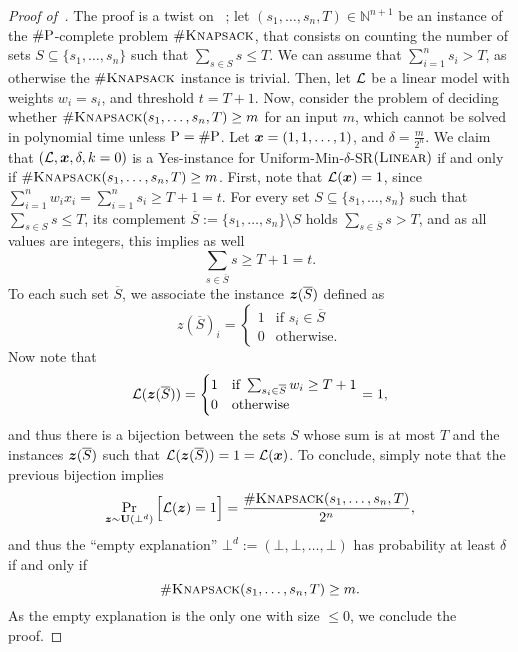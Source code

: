 \begin{proof}[Proof of~]
    The proof is a twist on ~\citet[Lemma 28]{NEURIPS2020_b1adda14}; let $(s_1, \ldots, s_n, T) \in \mathbb{N}^{n+1}$ be an instance of the $\# \mathrm{P}$-complete problem $\#\textsc{Knapsack}$, that consists on counting the number of sets $S \subseteq \{s_1, \ldots, s_n\}$ such that $\sum_{s \in S}s \leq T$.  
    We can assume that $\sum_{i=1}^n s_i > T$, as otherwise the $\# \textsc{Knapsack}$ instance is trivial.
    Then, let $\mathcal{L}$ be a linear model with weights $w_i = s_i$, and threshold $t = T+1$.
    Now, consider the problem of deciding whether $\#\textsc{Knapsack}(s_1, \ldots, s_n, T) \geq m$ for an input $m$, which cannot be solved in polynomial time unless $\mathrm{P} = \# \mathrm{P}$.
    Let ${\bm{x}} = (1, 1, \ldots, 1)$, and $\delta = \frac{m}{2^{n}}$. We claim that $(\mathcal{L}, {\bm{x}}, \delta, k=0)$ is a Yes-instance for Uniform-Min-$\delta$-SR$(\textsc{Linear})$ if and only if $\#\textsc{Knapsack}(s_1, \ldots, s_n, T) \geq m$. 
    First, note that $\mathcal{L}({\bm{x}}) = 1$, since $\sum_{i=1}^n w_i x_i = \sum_{i=1}^n s_i \geq T+1 = t$. 
    For every set $S \subseteq \{s_1, \ldots, s_n\}$ such that $\sum_{s \in S}s \leq T$, its complement $\overline{S} := \{s_1, \ldots, s_n\} \setminus S$ holds $\sum_{s \in \overline{S}}s > T$, and as all values are integers, this implies as well
    \[
        \sum_{s \in \overline{S}} s \geq T+1 = t.
    \]
    To each such set $\overline{S}$, we associate the instance ${\bm{z}}(\overline{S})$ defined as
    \[
        z(\overline{S})_i = \begin{cases}
            1 & \text{if } s_i \in \overline{S}\\
            0 & \text{otherwise}.
        \end{cases}
    \]
    Now note that 
    \[
        \mathcal{L}({\bm{z}}(\overline{S})) = \begin{cases}
            1 & \text{if } \sum_{s_i \in \overline{S}} w_i \geq T+1\\
            0 & \text{otherwise} \end{cases} = 1,
    \]
    and thus there is a bijection between the sets $S$ whose sum is at most $T$ and the instances ${\bm{z}}(\overline{S})$ such that $\mathcal{L}({\bm{z}}(\overline{S})) = 1 = \mathcal{L}({\bm{x}})$.
    To conclude, simply note that the previous bijection implies
    \[
        \Pr_{{\bm{z}} \sim \mathbf{U}(\bot^d)}\Big[\mathcal{L}({\bm{z}}) = 1\Big] = \frac{\#\textsc{Knapsack}(s_1, \ldots, s_n, T)}{2^n},
    \] 
    and thus the ``empty explanation'' $\bot^d := (\bot, \bot, \ldots, \bot)$ has probability at least $\delta$ if and only if 
    \[ 
    \#\textsc{Knapsack}(s_1, \ldots, s_ n, T) \geq m.
    \]  As the empty explanation is the only one with size $\leq 0$, we conclude the proof.
    


\end{proof}
